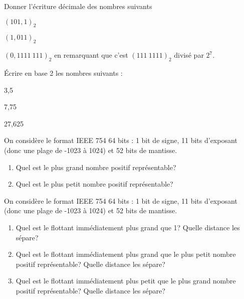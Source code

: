\begin{exercice}[]
    Donner l'écriture décimale des nombres suivants\begin{enumalph}
        \item 	$(101,1)_2$
        \item 	$(1,011)_2$
        \item 	$(0,1111\ 111)_2$ en remarquant que c'est \og $(111\ 1111)_2$ divisé par $2^7$.
    \end{enumalph}
\end{exercice}
\begin{exercice}[]
    \'Ecrire en base 2 les nombres suivants :
    \begin{enumalph}
        \item 	3,5
        \item 	7,75
        \item 	27,625
    \end{enumalph}
\end{exercice}

\begin{exercice}
    On considère le format IEEE 754 64 bits : 1 bit de signe, 11 bits d'exposant (donc une plage de -1023 à 1024) et 52 bits de
    mantisse.
    \begin{enumerate}
        \item 	Quel est le plus grand nombre positif représentable?
        \item 	Quel est le plus petit nombre positif représentable?
    \end{enumerate}
\end{exercice}

\begin{exercice}
    On considère le format IEEE 754 64 bits : 1 bit de signe, 11 bits d'exposant (donc une plage de -1023 à 1024) et 52 bits de
    mantisse.
    \begin{enumerate}
        \item 	Quel est le flottant immédiatement plus grand que 1? Quelle distance les sépare?
        \item 	Quel est le flottant immédiatement plus grand que le plus petit nombre positif représentable? Quelle distance les sépare?
        \item 	Quel est le flottant immédiatement plus petit que le plus grand nombre positif représentable? Quelle distance les sépare?
    \end{enumerate}
\end{exercice}

